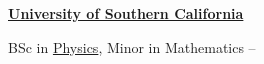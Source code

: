 \documentclass[letterpaper,MMMyyyy,nonstopmode]{simpleresumecv}
\begin{document}
\begin{Body}
\begin{Detail}
\begin{Detail}
\begin{Detail}

\BigGap
\Entry
\href{http://www.usc.edu}
{\textbf{University of Southern California}}

\Gap
\BulletItem
BSc in 
\href{https://dornsife.usc.edu/physics/}
{Physics}, Minor in Mathematics
\hfill
{} --
\end{Detail}











\end{Detail}
\end{Detail}
\end{Body}
\end{document}
